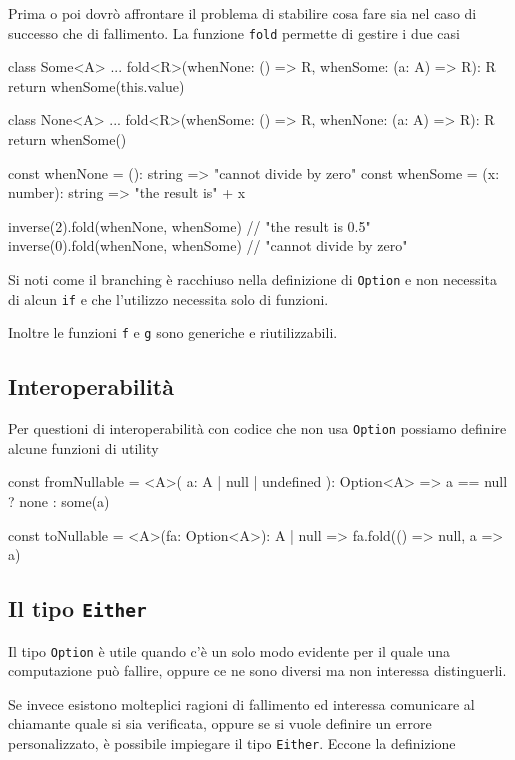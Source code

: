 \documentclass[12pt]{article}
\theoremstyle{definition}
\newenvironment{code}
  {\vspace{0.5cm} \VerbatimEnvironment\begin{typescriptcode}}
  {\end{typescriptcode} \vspace{0.2cm}}
\begin{document}
Prima o poi dovrò affrontare il problema di stabilire cosa fare sia nel caso di successo che di fallimento.
La funzione \texttt{fold} permette di gestire i due casi

\begin{code}
class Some<A> {
  ...
  fold<R>(whenNone: () => R, whenSome: (a: A) => R): R {
    return whenSome(this.value)
  }
}

class None<A> {
  ...
  fold<R>(whenSome: () => R, whenNone: (a: A) => R): R {
    return whenSome()
  }
}

const whenNone = (): string => "cannot divide by zero"
const whenSome = (x: number): string => "the result is" + x

inverse(2).fold(whenNone, whenSome) // "the result is 0.5"
inverse(0).fold(whenNone, whenSome) // "cannot divide by zero"
\end{code}

Si noti come il branching è racchiuso nella definizione di \texttt{Option} e non necessita di alcun \texttt{if}
e che l'utilizzo necessita solo di funzioni.

Inoltre le funzioni \texttt{f} e \texttt{g} sono generiche e riutilizzabili.

\subsection{Interoperabilità}

Per questioni di interoperabilità con codice che non usa \texttt{Option} possiamo definire alcune funzioni di utility

\begin{code}
const fromNullable = <A>(
  a: A | null | undefined
): Option<A> => a == null ? none : some(a)

const toNullable = <A>(fa: Option<A>): A | null =>
  fa.fold(() => null, a => a)
\end{code}

\subsection{Il tipo \texttt{Either}}

Il tipo \texttt{Option} è utile quando c'è un solo modo evidente per il quale una computazione può fallire,
oppure ce ne sono diversi ma non interessa distinguerli.

Se invece esistono molteplici ragioni di fallimento ed interessa comunicare al chiamante quale si sia verificata,
oppure se si vuole definire un errore personalizzato, è possibile impiegare il tipo \texttt{Either}. Eccone la definizione
\end{document}
